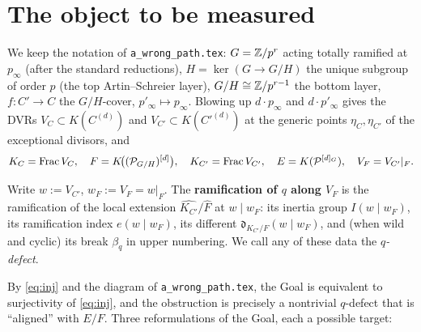 \documentclass[11pt]{article}
\begin{document}
\section{The object to be measured}\label{sec:object}

We keep the notation of \texttt{a\_wrong\_path.tex}: $G=\mathbb{Z}/p^r$ acting totally
ramified at $p_\infty$ (after the standard reductions), $H=\ker(G\to G/H)$ the
unique subgroup of order $p$ (the top Artin--Schreier layer), $G/H\cong
\mathbb{Z}/p^{r-1}$ the bottom layer, $f:C'\to C$ the $G/H$-cover, $p'_\infty\mapsto
p_\infty$. Blowing up $d\cdot p_\infty$ and $d\cdot p'_\infty$ gives the DVRs
$V_C\subset K(C^{(d)})$ and $V_{C'}\subset K(C'^{(d)})$ at the generic points
$\eta_C,\eta_{C'}$ of the exceptional divisors, and
\[
K_C=\operatorname{Frac} V_C,\quad
F=K\!\big((\mathcal{P}_{G/H})^{[d]}\big),\quad
K_{C'}=\operatorname{Frac} V_{C'},\quad
E=K(\mathcal{P}^{[d]_G}),\quad V_F=V_{C'}|_F .
\]

\begin{definition}\label{def:defect}
Write $w:=V_{C'}$, $w_F:=V_F=w|_F$. The \textbf{ramification of $q$ along
$V_F$} is the ramification of the local extension
$\widehat{K_{C'}}/\widehat F$ at $w\mid w_F$: its inertia group
$I(w\mid w_F)$, its ramification index $e(w\mid w_F)$, its different
$\mathfrak d_{K_{C'}/F}(w\mid w_F)$, and (when wild and cyclic) its break
$\beta_q$ in upper numbering. We call any of these data the \emph{$q$-defect}.
\end{definition}

By \cref{eq:inj} and the diagram of \texttt{a\_wrong\_path.tex}, the Goal is
equivalent to surjectivity of \cref{eq:inj}, and the obstruction is precisely a
nontrivial $q$-defect that is ``aligned'' with $E/F$. Three reformulations of the
Goal, each a possible target:
\end{document}

